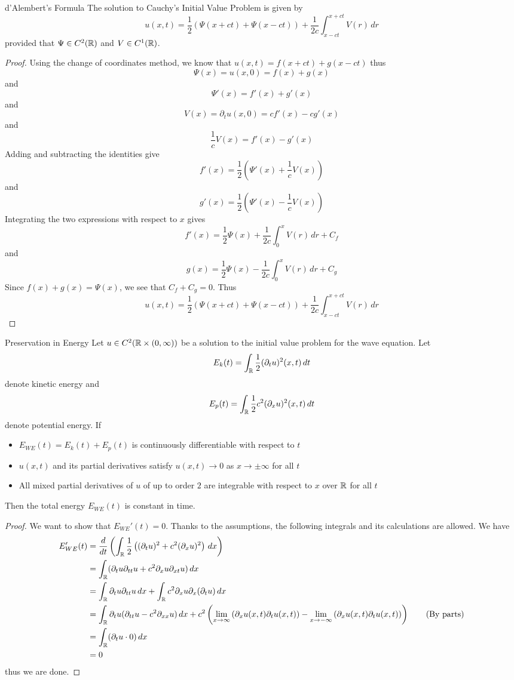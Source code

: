 \documentclass[a4paper]{article}
\begin{document}
\begin{prp}{d'Alembert's Formula}{} The solution to Cauchy's Initial Value Problem is given by $$u(x,t)=\frac{1}{2}\left(\Psi(x+ct)+\Psi(x-ct)\right)+\frac{1}{2c}\int_{x-ct}^{x+ct}V(r)\,dr$$ provided that $\Psi\in C^2(\mathbb{R})$ and $V\in C^1(\mathbb{R})$. \tcbline
\begin{proof} Using the change of coordinates method, we know that $u(x,t)=f(x+ct)+g(x-ct)$ thus $$\Psi(x)=u(x,0)=f(x)+g(x)$$ and $$\Psi'(x)=f'(x)+g'(x)$$ and $$V(x)=\partial_tu(x,0)=cf'(x)-cg'(x)$$ and $$\frac{1}{c}V(x)=f'(x)-g'(x)$$ Adding and subtracting the identities give $$f'(x)=\frac{1}{2}(\Psi'(x)+\frac{1}{c}V(x))$$ and $$g'(x)=\frac{1}{2}(\Psi'(x)-\frac{1}{c}V(x))$$ Integrating the two expressions with respect to $x$ gives $$f'(x)=\frac{1}{2}\Psi(x)+\frac{1}{2c}\int_0^xV(r)\,dr+C_f$$ and $$g(x)=\frac{1}{2}\Psi(x)-\frac{1}{2c}\int_0^xV(r)\,dr+C_g$$ Since $f(x)+g(x)=\Psi(x)$, we see that $C_f+C_g=0$. Thus $$u(x,t)=\frac{1}{2}\left(\Psi(x+ct)+\Psi(x-ct)\right)+\frac{1}{2c}\int_{x-ct}^{x+ct}V(r)\,dr$$
\end{proof}
\end{prp}

\begin{prp}{Preservation in Energy}{} Let $u\in C^2(\mathbb{R}\times(0,\infty))$ be a solution to the initial value problem for the wave equation. Let $$E_k(t)=\int_{\mathbb{R}}\frac{1}{2}(\partial_tu)^2(x,t)\,dt$$ denote kinetic energy and $$E_p(t)=\int_{\mathbb{R}}\frac{1}{2}c^2(\partial_xu)^2(x,t)\,dt$$ denote potential energy. If
\begin{itemize}
\item $E_{WE}(t)=E_k(t)+E_p(t)$ is continuously differentiable with respect to $t$
\item $u(x,t)$ and its partial derivatives satisfy $u(x,t)\to 0$ as $x\to\pm\infty$ for all $t$
\item All mixed partial derivatives of $u$ of up to order $2$ are integrable with respect to $x$ over $\mathbb{R}$ for all $t$
\end{itemize}
Then the total energy $E_{WE}(t)$ is constant in time. \tcbline
\begin{proof}
We want to show that $E_{WE}'(t)=0$. Thanks to the assumptions, the following integrals and its calculations are allowed. We have 
\begin{align*}
E_{WE}'(t)&=\frac{d}{dt}\left(\int_{\mathbb{R}}\frac{1}{2}\left((\partial_tu)^2+c^2(\partial_xu)^2\right)\,dx\right)\\
&=\int_{\mathbb{R}}(\partial_tu\partial_{tt}u+c^2\partial_xu\partial_{xt}u)\,dx\\
&=\int_{\mathbb{R}}\partial_tu\partial_{tt}u\,dx+\int_{\mathbb{R}} c^2\partial_xu\partial_x(\partial_tu)\,dx\\
&=\int_{\mathbb{R}}\partial_tu(\partial_{tt}u-c^2\partial_{xx}u)\,dx+c^2\left(\lim_{x\to\infty}\left(\partial_xu(x,t)\partial_tu(x,t)\right)-\lim_{x\to-\infty}\left(\partial_xu(x,t)\partial_tu(x,t)\right)\right)\tag{By parts}\\
&=\int_{\mathbb{R}}(\partial_tu\cdot 0)\,dx\\
&=0
\end{align*}
thus we are done. 
\end{proof}
\end{prp}
\end{document}
